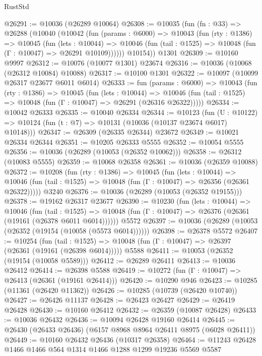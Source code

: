 \begin{lexlean}{RustStd}
\begin{coremodule}
{{@26291 := @10036 (@26289 @10064)
@26308 := @10035
    (fun (fn : @33) =>
    @26288
      (@10040
        (@10042
          (fun (params : @6000) =>
          @10043
            (fun (rty : @1386) =>
            @10045
              (fun (lets : @10044) =>
              @10046 (fun (tail : @1525) => @10048 (fun (Γ : @10047) => @26291 @10109))))))
        @10154))
    @1301
@26309 := @10160 @9997
@26312 := @10076 (@10077 @1301) @23674
@26316 := @10036 (@10068 (@26312 @10084) @10088)
@26317 := @10100 @1301
@26322 := @10097 (@10099 @26317 @23677 @6011 @6014)
@26333 := fun (params : @6000) =>
  @10043
    (fun (rty : @1386) =>
    @10045
      (fun (lets : @10044) =>
      @10046 (fun (tail : @1525) => @10048 (fun (Γ : @10047) => @26291 (@26316 @26322)))))
@26334 := @10042 @26333
@26335 := @10040 @26334
@26344 := @10123
    (fun (U : @10122) => @10124 (fun (t : @7) => @10131 (@10036 (@10137 @23674 @6017) @10148)))
@26347 := @26309 (@26335 @26344) @23672
@26349 := @10021 @26334 @26344
@26351 := @10205 @26333 @5555
@26352 := @10054 @5555
@26356 := @10036 (@26289 (@10053 (@26352 @10062)))
@26358 := @26312 (@10083 @5555)
@26359 := @10068 @26358
@26361 := @10036 (@26359 @10088)
@26372 := @10208
    (fun (rty : @1386) =>
    @10045
      (fun (lets : @10044) =>
      @10046 (fun (tail : @1525) => @10048 (fun (Γ : @10047) => @26356 (@26361 @26322)))))
    @3240
@26376 := @10036 (@26289 (@10053 (@26352 @19155)))
@26378 := @19162 @26317 @23677
@26390 := @10230
    (fun (lets : @10044) =>
    @10046
      (fun (tail : @1525) =>
      @10048 (fun (Γ : @10047) => @26376 (@26361 (@19161 (@26378 @6011 @6014))))))
    @5572
@26397 := @10036 (@26289 (@10053 (@26352 (@19154 (@10058 (@5573 @6014))))))
@26398 := @26378 @5572
@26407 := @10254
    (fun (tail : @1525) => @10048 (fun (Γ : @10047) => @26397 (@26361 (@19161 (@26398 @6014)))))
    @5588
@26411 := @10053 (@26352 (@19154 (@10058 @5589)))
@26412 := @26289 @26411
@26413 := @10036 @26412
@26414 := @26398 @5588
@26419 := @10272 (fun (Γ : @10047) => @26413 (@26361 (@19161 @26414)))
@26420 := @10290 @946
@26423 := @10285 (@11361 (@26420 @11362))
@26426 := @10285 (@10739 (@26420 @10740))
@26427 := @26426 @11137
@26428 := @26423 @26427
@26429 := @26419 @26428
@26430 := @10160 @26412
@26432 := @26359 (@10087 @26428)
@26433 := @10036 @26432
@26436 := @10094 @26428 @19160 @26414
@26445 := @26430 (@26433 @26436) (@6157 @8968 @8964 @26411 @8975 (@6028 @26411))
@26449 := @10160 @26432 @26436 (@10317 @26358)
@26464 := @11243
    @26428
    @1466
    @1466
    @564
    @1314
    @1466
    @1288
    @1299
    @19236
    @5569
    @5587
}}
\end{coremodule}
\end{lexlean}
